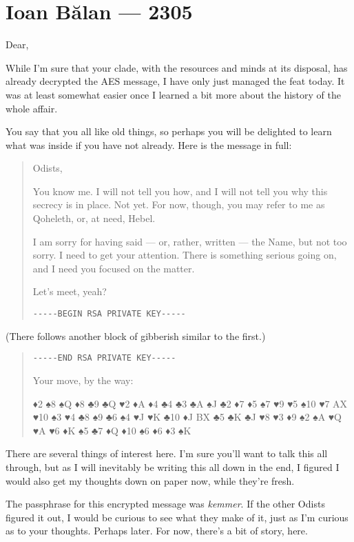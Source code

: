 \hypertarget{ioan-bux103lan-2305}{%
\chapter*{Ioan Bălan — 2305}\label{ioan-bux103lan-2305}}

Dear,

While I'm sure that your clade, with the resources and minds at its disposal, has already decrypted the AES message, I have only just managed the feat today. It was at least somewhat easier once I learned a bit more about the history of the whole affair.

You say that you all like old things, so perhaps you will be delighted to learn what was inside if you have not already. Here is the message in full:

\begin{quote}
Odists,

You know me. I will not tell you how, and I will not tell you why this secrecy is in place. Not yet. For now, though, you may refer to me as Qoheleth, or, at need, Hebel.

I am sorry for having said — or, rather, written — the Name, but not too sorry. I need to get your attention. There is something serious going on, and I need you focused on the matter.

Let's meet, yeah?\pagebreak

\texttt{-\/-\/-\/-\/-BEGIN\ RSA\ PRIVATE\ KEY-\/-\/-\/-\/-}
\end{quote}

(There follows another block of gibberish similar to the first.)

\begin{quote}
\texttt{-\/-\/-\/-\/-END\ RSA\ PRIVATE\ KEY-\/-\/-\/-\/-}

Your move, by the way:

{\TitleFont ♦2 ♠8 ♠Q ♦8 ♣9 ♣Q ♥2 ♦A ♦4 ♣4 ♣3 ♣A ♠J ♣2 ♦7 ♦5 ♠7 ♥9 ♥5 ♠10 ♥7 AX ♥10 ♠3 ♥4 ♣8 ♠9 ♣6 ♠4 ♥J ♥K ♣10 ♦J BX ♣5 ♣K ♣J ♥8 ♥3 ♦9 ♠2 ♠A ♥Q ♥A ♥6 ♦K ♠5 ♣7 ♦Q ♦10 ♠6 ♦6 ♦3 ♠K}
\end{quote}

There are several things of interest here. I'm sure you'll want to talk this all through, but as I will inevitably be writing this all down in the end, I figured I would also get my thoughts down on paper now, while they're fresh.

The passphrase for this encrypted message was \emph{kemmer}. If the other Odists figured it out, I would be curious to see what they make of it, just as I'm curious as to your thoughts. Perhaps later. For now, there's a bit of story, here.

